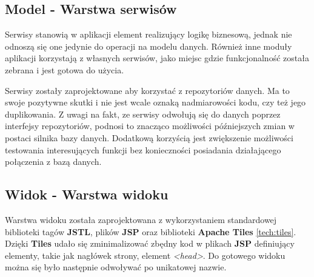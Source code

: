 \subsection{Model - Warstwa serwisów}
	Serwisy	stanowią w aplikacji element realizujący logikę biznesową, jednak nie odnoszą się one jedynie do operacji
	na modelu danych. Również inne moduły aplikacji korzystają z własnych serwisów, jako miejsc gdzie funkcjonalność została
	zebrana i jest gotowa do użycia. 	
	
	Serwisy zostały zaprojektowane aby korzystać z repozytoriów danych. Ma to swoje pozytywne skutki
	i nie jest wcale oznaką nadmiarowości kodu, czy też jego duplikowania. Z uwagi na fakt, ze serwisy
	odwołują się do danych poprzez interfejsy repozytoriów, podnosi to znacząco możliwości 
	późniejszych zmian w postaci silnika bazy danych. Dodatkową korzyścią jest zwiększenie możliwości testowania
	interesujących funkcji bez konieczności posiadania działającego połączenia z bazą danych.
	
\subsection{Widok - Warstwa widoku}
	Warstwa widoku została zaprojektowana z wykorzystaniem standardowej biblioteki tagów \textbf{JSTL}, plików \textbf{JSP} oraz biblioteki \textbf{Apache Tiles} \ref{tech:tiles}. Dzięki \textbf{Tiles} udało się zminimalizować zbędny kod w plikach \textbf{JSP} definiujący elementy, takie jak nagłówek strony, element \textit{<head>}. Do gotowego widoku można się było następnie odwoływać po unikatowej nazwie. 
	
